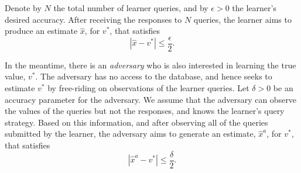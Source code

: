 \documentclass[final,12pt]{colt2018}
\begin{document}
Denote by $N$ the total number of learner queries, and by $\epsilon>0$ the learner's desired accuracy. After receiving the responses to $N$ queries, the {learner} aims to produce an estimate ${\hat{x}}$, for $v^*$, that satisfies
\begin{equation*}
|{\hat{x}}-v^*|\leq\frac{\epsilon}{2}.
\end{equation*}  

In the meantime, there is an \emph{adversary} who is also interested in learning the {true value}, $v^*$. The adversary has no access to the database, and hence  seeks to estimate $v^*$ by free-riding on observations of the learner queries. Let $\delta>0$ be an accuracy parameter for the adversary. We assume that the adversary can observe the values of the queries but not the responses, and knows the {learner}'s query strategy.  %
Based on this information, and after observing all of the queries submitted by the {learner}, the adversary aims to generate an estimate, $\hat{x}^a$, for $v^*$, that satisfies
\begin{equation*}
|\hat{x}^a-v^*|\leq\frac{\delta}{2}.
\end{equation*}  


\end{document}
